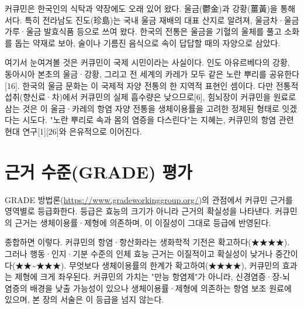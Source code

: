 \documentclass[12pt,oneside]{book}
\begin{document}
커큐민은 한국인의 식탁과 약장에도 오래 있어 왔다. 울금(鬱金)과 강황(薑黃)을 통해서다. 특히 전라남도 진도(珍島)는 국내 울금 재배의 대표 산지로 알려져, 울금차·울금가루·울금 발효식품 등으로 쓰여 왔다. 한국의 전통은 울금을 기혈의 울체를 풀고 소화를 돕는 약재로 보아, 술이나 기름진 음식으로 속이 답답할 때의 자양으로 삼았다.

여기서 눈여겨볼 것은 커큐민이 국제 시민이라는 사실이다. 인도 아유르베다의 강황, 동아시아 본초의 울금·강황, 그리고 전 세계의 카레가 모두 같은 노란 뿌리를 공유한다[16]. 한국의 울금 문화는 이 국제적 자양 전통의 한 지역적 표현인 셈이다. 다만 전통적 섭취(향신료·차)에서 커큐민의 실제 흡수량은 낮으므로[6], 힘뇌장이 커큐민을 원료로 삼는 것은 이 울금·카레의 항염 자양 전통을 생체이용률을 고려한 정제된 형태로 잇겠다는 시도다. "노란 뿌리로 속과 몸의 염증을 다스린다"는 지혜는, 커큐민의 항염 관련 현대 연구[1][26]와 은유적으로 이어진다.

\section{근거 수준(GRADE) 평가}

GRADE 방법론(\url{https://www.gradeworkinggroup.org/})의 관점에서 커큐민 근거를 영역별로 등급화한다. 등급은 효능의 크기가 아니라 근거의 확실성을 나타낸다. 커큐민의 근거는 생체이용률·제형에 의존하며, 이 이질성이 그대로 등급에 반영된다.

\vspace{2pt}\vspace{3pt}

종합하면 이렇다. 커큐민의 항염·항산화라는 생화학적 기전은 확고하다(★★★★). 그러나 행동·인지·기분 수준의 인체 효능 근거는 이질적이고 확실성이 낮거나 중간이다(★★\textasciitilde{}★★★). 무엇보다 생체이용률의 한계가 확고하여(★★★★), 커큐민의 효과는 제형에 크게 좌우된다. 커큐민의 가치는 "만능 항염제"가 아니라, 신경염증·장-뇌 염증의 배경을 낮출 가능성이 있으나 생체이용률·제형에 의존하는 항염 보조 원료에 있으며, 본 장의 서술은 이 등급을 넘지 않는다.
\end{document}
